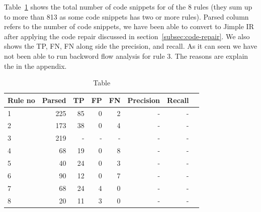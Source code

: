 Table~\ref{tab:results} shows the total number of code snippets for of the 8 rules (they sum up to more than 813 as some code snippets has two or more rules). Parsed column refers to the number of code snippets, we have been able to convert to Jimple IR after applying the code repair discussed in section~\ref{subsec:code-repair}. We also shows the TP, FN, FN along side the precision, and recall.
As it can seen we have not been able to run backword flow analysis for rule 3. The reasons are explain the in the appendix.


\begin{table}[ht]
\begin{tabular}{|l|r|r|r|r|r|r|r|}
\toprule
Rule no & Parsed & TP & FP & FN & Precision & Recall \\ \midrule
1 & 225 & 85 & 0 & 2 & - & - \\
2 & 173 & 38 & 0 & 4 & - & - \\
3 & 219 & - & - & - & - & - \\
4 & 68 & 19 &  0 & 8& - & - \\
5 & 40 & 24 & 0 & 3& - & - \\
6 & 90 & 12 & 0 & 7 & - & -\\ \midrule
7 & 68 & 24 & 4& 0 & - & - \\
8 & 20 & 11 & 3& 0 & - & -\\        
\bottomrule
\end{tabular}
\caption{Table}
\label{tab:results}
\end{table}
